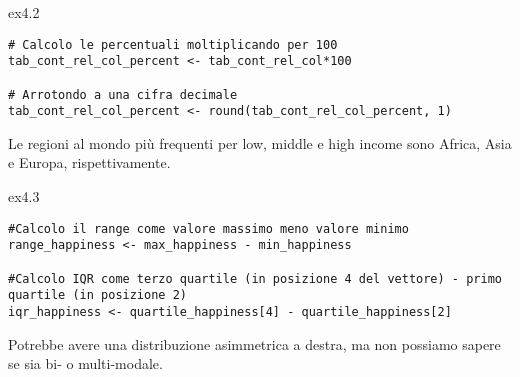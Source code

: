 \vspace{0.5cm}

\begin{solution}{ex4.2}
	
\begin{lstlisting}[style=Rstylescript]
# Calcolo le percentuali moltiplicando per 100
tab_cont_rel_col_percent <- tab_cont_rel_col*100

# Arrotondo a una cifra decimale
tab_cont_rel_col_percent <- round(tab_cont_rel_col_percent, 1)
\end{lstlisting}

\noindent Le regioni al mondo pi\`u frequenti per low, middle e high income sono Africa, Asia e Europa, rispettivamente.

\end{solution}

\vspace{0.5cm}

\begin{solution}{ex4.3}
	
\begin{lstlisting}[style=Rstylescript]
#Calcolo il range come valore massimo meno valore minimo
range_happiness <- max_happiness - min_happiness

#Calcolo IQR come terzo quartile (in posizione 4 del vettore) - primo quartile (in posizione 2)
iqr_happiness <- quartile_happiness[4] - quartile_happiness[2]
\end{lstlisting}

\noindent Potrebbe avere una distribuzione asimmetrica a destra, ma non possiamo sapere se sia bi- o multi-modale.

\end{solution}

\vspace{0.5cm}

